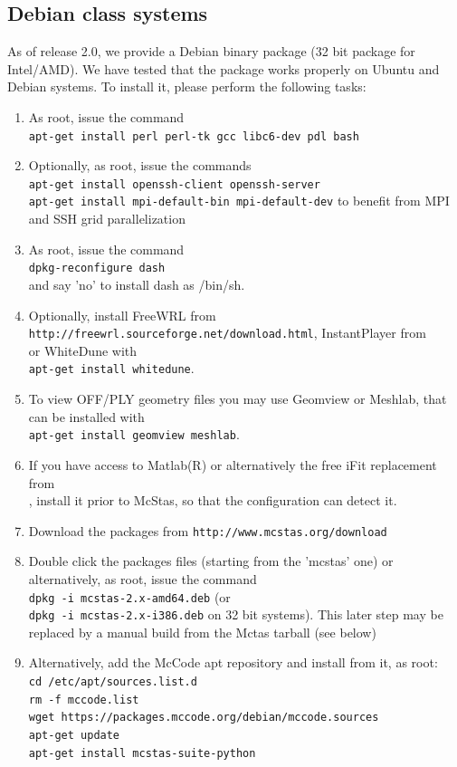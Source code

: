 \subsection{Debian class systems}
\label{ss:deb_install}
As of release 2.0, we provide a Debian binary package (32 bit package for Intel/AMD). We have tested that the
package works properly on Ubuntu and Debian systems. To install it, please
perform the following tasks:
\begin{enumerate}
\item{As root, issue the command \\\verb+apt-get install perl perl-tk gcc libc6-dev pdl bash+}
\item{Optionally, as root, issue the commands
\\\verb+apt-get install openssh-client openssh-server+
\\\verb+apt-get install mpi-default-bin mpi-default-dev+
to benefit from MPI and SSH grid parallelization}
\item{As root, issue the command \\\verb+dpkg-reconfigure dash+\\and
    say 'no' to install dash as /bin/sh.}
\item{Optionally, install FreeWRL from \verb+http://freewrl.sourceforge.net/download.html+, 
InstantPlayer from \\ 
or WhiteDune with \\\verb+apt-get install whitedune+.}
\item{To view OFF/PLY geometry files you may use Geomview or Meshlab, that can be installed with \\\verb+apt-get install geomview meshlab+.}
\item{If you have access to Matlab(R) or alternatively the free iFit replacement from \\, install it prior to McStas, so that the configuration can detect it.}
\item{Download the packages from \verb+http://www.mcstas.org/download+}
\item{Double click the packages files (starting from the 'mcstas' one) or alternatively, as root, issue the command \\\verb+dpkg -i mcstas-2.x-amd64.deb+ (or \\\verb+dpkg -i mcstas-2.x-i386.deb+ on 32 bit systems). This later step may be replaced by a manual build from the Mctas tarball (see below)}
\item{Alternatively, add the McCode apt repository and install from it, as root:
\\\verb+cd /etc/apt/sources.list.d+
\\\verb+rm -f mccode.list+
\\\verb+wget https://packages.mccode.org/debian/mccode.sources+
\\\verb+apt-get update+
\\\verb+apt-get install mcstas-suite-python+}
\end{enumerate}
